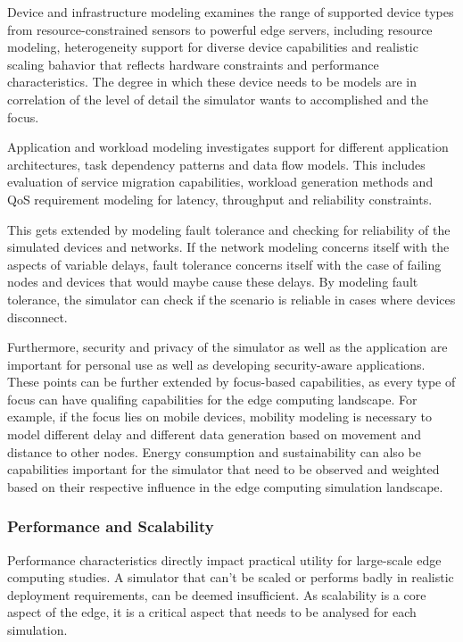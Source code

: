 Device and infrastructure modeling examines the range of supported device types from resource-constrained sensors to powerful edge servers, including resource modeling, heterogeneity support for diverse device capabilities and realistic scaling bahavior that reflects hardware constraints and performance characteristics.
The degree in which these device needs to be models are in correlation of the level of detail the simulator wants to accomplished and the focus.

Application and workload modeling investigates support for different application architectures, task dependency patterns and data flow models.
This includes evaluation of service migration capabilities, workload generation methods and QoS requirement modeling for latency, throughput and reliability constraints.

This gets extended by modeling fault tolerance and checking for reliability of the simulated devices and networks.
If the network modeling concerns itself with the aspects of variable delays, fault tolerance concerns itself with the case of failing nodes and devices that would maybe cause these delays.
By modeling fault tolerance, the simulator can check if the scenario is reliable in cases where devices disconnect. 

Furthermore, security and privacy of the simulator as well as the application are important for personal use as well as developing security-aware applications.
These points can be further extended by focus-based capabilities, as every type of focus can have qualifing capabilities for the edge computing landscape.
For example, if the focus lies on mobile devices, mobility modeling is necessary to model different delay and different data generation based on movement and distance to other nodes.
Energy consumption and sustainability can also be capabilities important for the simulator that need to be observed and weighted based on their respective influence in the edge computing simulation landscape.

\subsubsection{Performance and Scalability}
Performance characteristics directly impact practical utility for large-scale edge computing studies.
A simulator that can't be scaled or performs badly in realistic deployment requirements, can be deemed insufficient.
As scalability is a core aspect of the edge, it is a critical aspect that needs to be analysed for each simulation.

